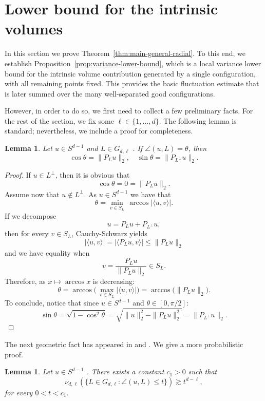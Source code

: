 \documentclass[10pt]{amsart}
\newcommand{\1}{\textbf{1}}
\numberwithin{equation}{section} %
\newtheorem{lemma}[theorem]{Lemma}
\theoremstyle{remark}
\theoremstyle{definition}
\begin{document}
\section{Lower bound for the intrinsic volumes}

In this section we prove Theorem~\ref{thm:main-general-radial}. To this end, we establish Proposition~\ref{prop:variance-lower-bound}, which  is a local variance lower bound for the intrinsic volume contribution generated by a single configuration, with all remaining points fixed. This provides the basic fluctuation estimate that is later summed over the many well-separated good configurations.

However, in order to do so, we first need to collect a few preliminary facts. For the rest of the section, we fix some $\ell \in \{1,\ldots,d\}$. The following lemma is standard; nevertheless, we include a proof for completeness.


\begin{lemma}\label{lem:angle-and-projection}
    Let $u \in S^{d-1}$ and $L \in G_{d,\ell}$ . If $\angle(u,L)=\theta$, then \[\cos \theta =\|P_Lu\|_2, \quad \sin\theta= \|P_{L^\perp}u\|_2.\]
\end{lemma}

\begin{proof}
If $u \in L^\perp$, then it is obvious that \[\cos\theta=0=\|P_Lu\|_2.\] Assume now that $u \notin L^\perp$.
    As $u \in S^{d-1}$ we have that \[\theta=\min_{v \in S_L} \, \arccos|\langle u,v \rangle|.\] If we decompose \[u=P_Lu+P_{L^\perp}u,\] then for every $v \in S_L$, Cauchy-Schwarz yields \[|\langle u,v\rangle|=|\langle P_Lu,v\rangle| \leq \|P_Lu\|_2\] and we have equality when \[v=\frac{P_Lu}{\|P_Lu\|_2} \in S_L.\] Therefore, as $x \mapsto\arccos x$ is decreasing: \[\theta =\arccos \bigl(\,\max_{v \in S_L} |\langle u,v\rangle|\bigr)=\arccos\bigl(\|P_Lu\|_2\bigr).\] To conclude, notice that since $u \in S^{d-1}$ and $\theta \in [0,\pi/2]$: \[\sin\theta=\sqrt{1-\cos^2\theta}=\sqrt{\|u\|_2^2-\|P_Lu\|_2^2}=\|P_{L^\perp}u\|_2.\]
\end{proof}

The next geometric fact has appeared in \cite{Bar-Fod-Vig} and \cite{Bar-Th}. We give a more probabilistic proof.

\begin{lemma}\label{lem:small-angles-measure}
    Let $u \in S^{d-1}$ . There exists a constant $c_1>0$ such that \[\nu_{d,\ell}(\{L \in G_{d,\ell}: \angle (u,L) \leq t\}) \gtrsim t^{d-\ell}, \] for every $0<t<c_1$.
\end{lemma}
\end{document}
